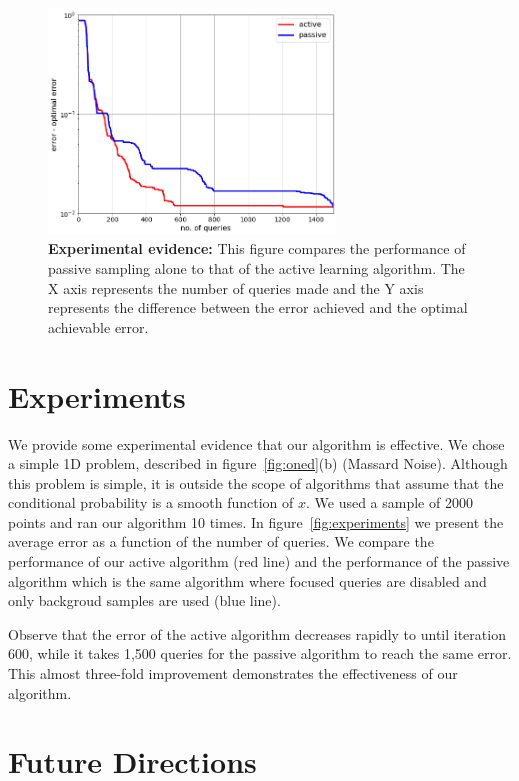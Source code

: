 \documentclass[twoside]{article}
\begin{document}
\begin{figure}
\begin{center}
\includegraphics[width=3in]{figures/MassartExperiment.png}
\end{center}
\caption{{\bf Experimental evidence:} This figure compares the
  performance of passive sampling alone to that of the active learning
  algorithm. The X axis represents the number of queries made and the
  Y axis represents the difference between the error achieved and the
  optimal achievable error.}
\label{fig:Experiments}
\end{figure}

\section{Experiments}

We provide some experimental evidence that our algorithm is effective.
We chose a simple 1D problem, described in figure~\ref{fig:oned}(b)
(Massard Noise).  Although this problem is simple, it is outside the
scope of algorithms that assume that the conditional probability is a
smooth function of $x$. We used a sample of 2000 points and ran our
algorithm 10 times. In figure~\ref{fig:experiments} we present the
average error as a function of the number of queries. We compare the
performance of our active algorithm (red line) and the performance of the passive algorithm which is the
same algorithm where focused queries are disabled and only backgroud samples are used (blue line).

Observe that the error of the active algorithm decreases rapidly to
until iteration 600, while it takes 1,500 queries for the passive
algorithm to reach the same error. This almost three-fold improvement
demonstrates the effectiveness of our algorithm.

\section{Future Directions}
\end{document}
